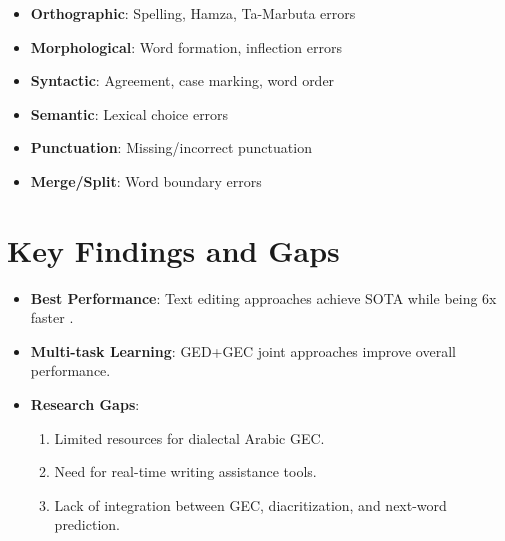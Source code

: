 \documentclass{article}
\begin{document}
\begin{itemize}
    \item \textbf{Orthographic}: Spelling, Hamza, Ta-Marbuta errors
    \item \textbf{Morphological}: Word formation, inflection errors
    \item \textbf{Syntactic}: Agreement, case marking, word order
    \item \textbf{Semantic}: Lexical choice errors
    \item \textbf{Punctuation}: Missing/incorrect punctuation
    \item \textbf{Merge/Split}: Word boundary errors
\end{itemize}

\section{\textcolor{accentred}{Key Findings and Gaps}}
\begin{itemize}
    \item \textbf{Best Performance}: Text editing approaches achieve SOTA while being 6x faster \cite{alhafni2025enhancing}.
    \item \textbf{Multi-task Learning}: GED+GEC joint approaches improve overall performance.
    \item \textbf{Research Gaps}:
    \begin{enumerate}
        \item Limited resources for dialectal Arabic GEC.
        \item Need for real-time writing assistance tools.
        \item Lack of integration between GEC, diacritization, and next-word prediction.
    \end{enumerate}
\end{itemize}
\end{document}

